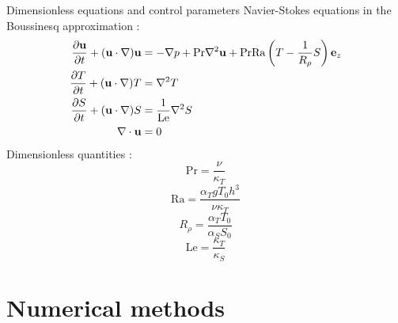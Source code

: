 \documentclass[10pt]{beamer}
\def\Ra{\mathrm{Ra}}
\def\Pr{\mathrm{Pr}}
\def\Le{\mathrm{Le}}
\begin{document}
\begin{frame}{Dimensionless equations and control parameters}
Navier-Stokes equations in the Boussinesq approximation :
\begin{equation}\label{eq:ns}
  \begin{aligned}
    \frac{\partial\mathbf{u}}{\partial t} + (\mathbf{u}\cdot\nabla)\mathbf{u} & = -\nabla p + \Pr\nabla^2\mathbf{u} + \Pr\Ra\left(T - \frac{1}{R_{\rho}}S\right)\vf{e}_z \\
    \frac{\partial T}{\partial t} + (\mathbf{u}\cdot\nabla)T                  & = \nabla^2T                                                                              \\
    \frac{\partial S}{\partial t} + (\mathbf{u}\cdot\nabla)S                  & = \frac{1}{\Le}\nabla^2S                                                                 \\
    \nabla\cdot\mathbf{u}                                                     & = 0
  \end{aligned}
\end{equation}
Dimensionless quantities : 
\begin{equation}
    \Pr = \frac{\nu}{\kappa_T}
\end{equation}
\begin{equation}
    \Ra = \frac{\alpha_T g T_0 h^3}{\nu \kappa_T}
\end{equation}
\begin{equation}
    R_{\rho} = \frac{\alpha_T T_0}{\alpha_S S_0}
\end{equation}
\begin{equation}
    \Le = \frac{\kappa_T}{\kappa_S}
\end{equation}
\end{frame}

\section{Numerical methods}
\end{document}
